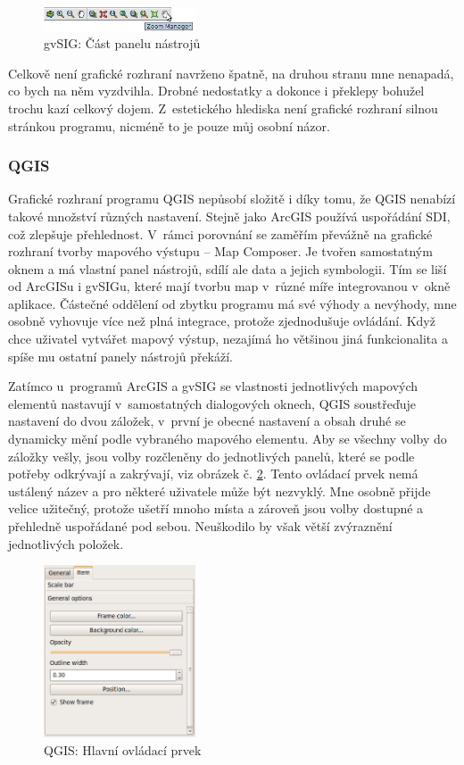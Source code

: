 \documentclass[a4paper,12pt,draft]{article}
\begin{document}
\begin{figure}[h!]
\centering
\includegraphics[width=0.4\textwidth]{./GUI_screenshots/gvSIG_toolbar.png}
\caption{gvSIG: Část panelu nástrojů}
\label{fig:gvSIG_toolbar}
\end{figure}


Celkově není grafické rozhraní navrženo špatně, na druhou stranu mne
nenapadá, co bych na něm vyzdvihla. Drobné nedostatky a dokonce i překlepy
bohužel trochu kazí celkový dojem. Z~estetického hlediska není grafické
rozhraní silnou stránkou programu, nicméně to je pouze můj osobní názor.

\subsubsection{QGIS}
Grafické rozhraní programu QGIS nepůsobí složitě i díky tomu, že QGIS
nenabízí takové množství různých nastavení. Stejně jako ArcGIS používá
uspořádání SDI, což zlepšuje přehlednost. V~rámci porovnání se zaměřím převážně
na grafické rozhraní tvorby mapového výstupu -- Map Composer. Je tvořen
samostatným oknem a má vlastní panel nástrojů, sdílí ale data a jejich
symbologii. Tím se liší od ArcGISu i gvSIGu, které mají tvorbu map
v~různé míře integrovanou v~okně aplikace. Částečné oddělení od zbytku
programu má své výhody a nevýhody, mne osobně vyhovuje více než
plná integrace, protože zjednodušuje ovládání. Když chce uživatel
vytvářet mapový výstup, nezajímá ho většinou jiná funkcionalita a
spíše mu ostatní panely nástrojů překáží.

Zatímco u~programů ArcGIS a gvSIG se vlastnosti jednotlivých mapových
elementů nastavují v~samostatných dialogových oknech, QGIS soustřeďuje
nastavení do dvou záložek, v~první je obecné nastavení a obsah
druhé se dynamicky mění podle vybraného mapového elementu. Aby se
všechny volby do záložky vešly, jsou volby rozčleněny do jednotlivých
panelů, které se podle potřeby odkrývají a zakrývají, viz obrázek
č. \ref{fig:QGIS_panel}. Tento ovládací prvek nemá ustálený název
a pro některé uživatele může být nezvyklý. Mne osobně přijde
velice užitečný, protože ušetří mnoho místa a zároveň jsou volby
dostupné a přehledně uspořádané pod sebou. Neuškodilo by však větší
zvýraznění jednotlivých položek.


\begin{figure}[h!]
\centering
\includegraphics[width=0.4\textwidth]{./GUI_screenshots/QGIS_panel.png}
\caption{QGIS: Hlavní ovládací prvek}
\label{fig:QGIS_panel}
\end{figure}
\end{document}
